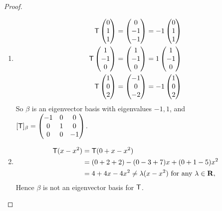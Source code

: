 \begin{proof}
\begin{enumerate}
\item
\begin{align*}
    \textsf{T} \begin{pmatrix} 0 \\ 1 \\ 1 \end{pmatrix} & = \begin{pmatrix} 0 \\ -1 \\ -1 \end{pmatrix} = -1 \begin{pmatrix} 0 \\ 1 \\ 1 \end{pmatrix} \\
    \textsf{T} \begin{pmatrix} 1 \\ -1 \\ 0 \end{pmatrix} & = \begin{pmatrix} 1 \\ -1 \\ 0 \end{pmatrix} = 1 \begin{pmatrix} 1 \\ -1 \\ 0 \end{pmatrix} \\
    \textsf{T} \begin{pmatrix} 1 \\ 0 \\ 2 \end{pmatrix} & = \begin{pmatrix} -1 \\ 0 \\ -2 \end{pmatrix} = -1 \begin{pmatrix} 1 \\ 0 \\ 2 \end{pmatrix}
\end{align*}
So \(\beta\) is an eigenvector basis with eigenvalues \(-1, 1\), and \([\textsf{T}]_{\beta} = \begin{pmatrix} -1 & 0 & 0 \\ 0 & 1 & 0 \\ 0 & 0 & -1 \end{pmatrix}\).

\item
\begin{align*}
    \textsf{T}(x - x^2) & = \textsf{T}(0 + x - x^2) \\
        & =(0 + 2 + 2) - (0 - 3 + 7)x + (0 + 1 - 5)x^2 \\
        & = 4 + 4x - 4x^2
        \ne \lambda (x - x^2) \text{ for any \(\lambda \in \mathbf{R}\)},
\end{align*}
Hence \(\beta\) is not an eigenvector basis for \(\textsf{T}\).


\end{enumerate}
\end{proof}
